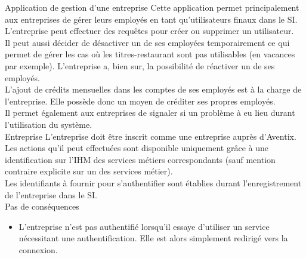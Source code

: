 \CUBref
{Application de gestion d'une entreprise}
{
  Cette application permet principalement aux entreprises de gérer leurs
  employés en tant qu'utilisateurs finaux dans le SI. \\

  L'entreprise peut effectuer des requêtes pour créer ou supprimer un
  utilisateur. \\

  Il peut aussi décider de désactiver un de ses employées temporairement ce qui
  permet de gérer les cas où les titres-restaurant sont pas utilisables (en
  vacances par exemple). L'entreprise a, bien sur, la possibilité de réactiver
  un de ses employés. \\

  L'ajout de crédits mensuelles dans les comptes de ses employés est à la
  charge de l'entreprise. Elle possède donc un moyen de créditer ses propres
  employés. \\

  Il permet également aux entreprises de signaler si un problème à eu lieu
  durant l'utilisation du système. \\
}
{Entreprise}
{
  L'entreprise doit être inscrit comme une entreprise auprès d'Aventix. \\

  Les actions qu'il peut effectuées sont disponible uniquement grâce à une
  identification sur l'IHM des services métiers correspondants (sauf mention
  contraire explicite sur un des services métier). \\

  Les identifiants à fournir pour s'authentifier sont établies durant
  l'enregistrement de l'entreprise dans le SI. \\
}
{Pas de conséquences}
{
  \begin{itemize}
    \item L'entreprise n'est pas authentifié lorsqu'il essaye d'utiliser un
      service nécessitant une authentification. Elle est alors simplement
      redirigé vers la connexion.
  \end{itemize}
}

